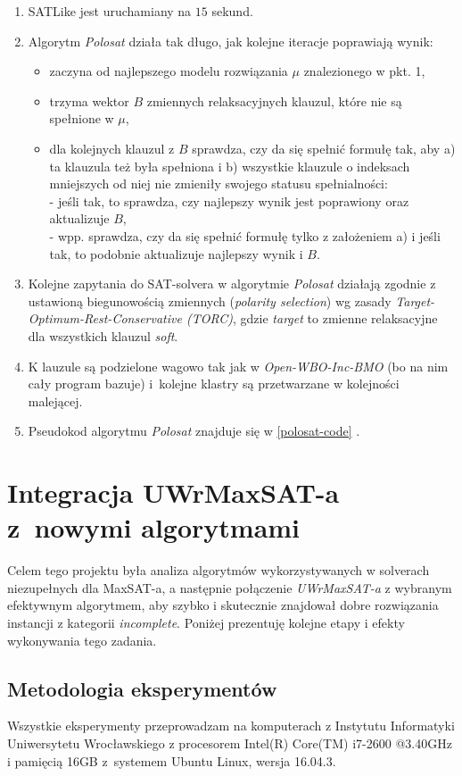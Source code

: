 \documentclass[shortabstract]{iithesis}
\begin{document}
\begin{enumerate}
	\item SATLike jest uruchamiany na $15$ sekund.
	\item Algorytm \textit{Polosat} działa tak długo, jak kolejne iteracje poprawiają wynik:
	\begin{itemize}
		\item zaczyna od najlepszego modelu rozwiązania $\mu$ znalezionego w pkt. 1,
		\item trzyma wektor $B$ zmiennych relaksacyjnych klauzul, które nie są spełnione w $\mu$,
		\item dla kolejnych klauzul z $B$ sprawdza, czy da się spełnić formułę tak, aby a) ta klauzula też była spełniona i b) wszystkie klauzule o indeksach mniejszych od niej nie zmieniły swojego statusu spełnialności: \\ - jeśli tak, to sprawdza, czy najlepszy wynik jest poprawiony oraz aktualizuje $B$,\\ - wpp. sprawdza, czy da się spełnić formułę tylko z założeniem a) i jeśli tak, to podobnie aktualizuje najlepszy wynik i $B$.
	\end{itemize}
	\item Kolejne zapytania do SAT-solvera w algorytmie \textit{Polosat} działają zgodnie z ustawioną biegunowością zmiennych (\textit{polarity selection}) wg zasady \textit{Target-Optimum-Rest-Conservative (TORC)}, gdzie \textit{target} to zmienne relaksacyjne dla wszystkich klauzul \textit{soft}.
	\item K	lauzule są podzielone wagowo tak jak w \textit{Open-WBO-Inc-BMO} (bo na nim cały program bazuje) i~kolejne klastry są przetwarzane w kolejności malejącej.
	\item Pseudokod algorytmu \textit{Polosat} znajduje się w \ref{polosat-code} .
\end{enumerate}
\chapter{Integracja UWrMaxSAT-a z~nowymi algorytmami}
Celem tego projektu była analiza algorytmów wykorzystywanych w solverach niezupełnych dla MaxSAT-a, a następnie połączenie \textit{UWrMaxSAT-a} z wybranym efektywnym algorytmem, aby szybko 
i skutecznie znajdował dobre rozwiązania instancji z kategorii \textit{incomplete}. Poniżej prezentuję kolejne etapy i efekty wykonywania tego zadania.

\section{Metodologia eksperymentów}
Wszystkie eksperymenty przeprowadzam na komputerach z Instytutu Informatyki Uniwersytetu Wrocławskiego z procesorem Intel(R) Core(TM) i7-2600 @3.40GHz i pamięcią 16GB z~systemem Ubuntu Linux, wersja 16.04.3. 
\end{document}
